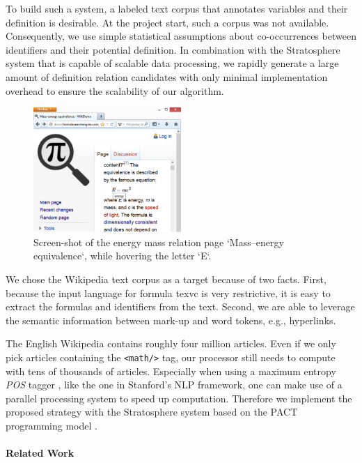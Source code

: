 \documentclass[runningheads]{llncs}
\begin{document}
To build such a system, a labeled text corpus that annotates variables
and their definition is desirable.
At the project start, such a corpus was not available.
Consequently, we use simple statistical assumptions about co-occurrences between identifiers
and their potential definition.
In combination with the Stratosphere system
that is capable of scalable data processing,  we rapidly generate a large amount of 
definition relation 
candidates with only minimal implementation overhead to ensure the scalability of our algorithm.

\begin{figure}
	\label{fig:screenshot}
  \includegraphics[width=0.5\textwidth]{screenshot}
  \caption{Screen-shot of the energy mass relation page `Mass–energy equivalence`, while hovering the letter `E`.}
  \vspace{-20pt}
\end{figure}
We chose the Wikipedia text corpus as a target because of two facts.
First, because the input language for formula texvc is very restrictive, it is easy to extract the formulas and identifiers from the text.
Second, we are able to leverage the semantic information between mark-up and
word tokens, e.g., hyperlinks.

The English Wikipedia contains roughly four million articles.
Even if we only
pick articles containing the \texttt{<math/>} tag, our processor still needs
to compute with tens of thousands of articles.
Especially when using a maximum
entropy \emph{POS} tagger \cite{Rathna96}, like the one in Stanford's NLP
framework, one can make use of a parallel processing system to speed up
computation.
Therefore we implement the proposed strategy with the Stratosphere system based
on the PACT programming model \cite{Alexandrov2010}.


\paragraph{Related Work}
\end{document}
